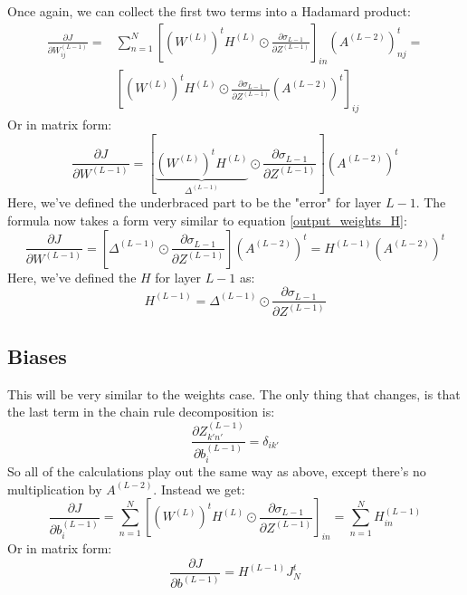 \documentclass[12pt, a4paper]{article}
\numberwithin{equation}{section}
\begin{document}
Once again, we can collect the first two terms into a Hadamard product:
\begin{align}
\frac{\partial J}{\partial W^{(L-1)}_{ij}}=&\sum_{n=1}^N\left[\left(W^{(L)}\right)^t H^{(L)}\odot\frac{\partial\sigma_{L-1}}{\partial Z^{(L-1)}}\right]_{in}\left(A^{(L-2)}\right)^t_{nj}=\\
&\left[\left(W^{(L)}\right)^t H^{(L)}\odot\frac{\partial\sigma_{L-1}}{\partial Z^{(L-1)}}\left(A^{(L-2)}\right)^t\right]_{ij}
\end{align}
Or in matrix form:
\begin{equation}
\label{last_hidden_weights_matrix}
\frac{\partial J}{\partial W^{(L-1)}}=\left[\underbrace{\left(W^{(L)}\right)^t H^{(L)}}_{\Delta^{(L-1)}}\odot\frac{\partial\sigma_{L-1}}{\partial Z^{(L-1)}}\right]\left(A^{(L-2)}\right)^t
\end{equation}
Here, we've defined the underbraced part to be the "error" for layer $L-1$. The formula now takes a form very similar to equation \ref{output_weights_H}:
\begin{equation}
\frac{\partial J}{\partial W^{(L-1)}}=\left[\Delta^{(L-1)}\odot\frac{\partial\sigma_{L-1}}{\partial Z^{(L-1)}}\right]\left(A^{(L-2)}\right)^t=H^{(L-1)}\left(A^{(L-2)}\right)^t
\end{equation}
Here, we've defined the $H$ for layer $L-1$ as:
\begin{equation}
H^{(L-1)}=\Delta^{(L-1)}\odot\frac{\partial\sigma_{L-1}}{\partial Z^{(L-1)}}
\end{equation}

\subsection{Biases}
This will be very similar to the weights case. The only thing that changes, is that the last term in the chain rule decomposition is:
\begin{equation}
\frac{\partial Z^{(L-1)}_{k'n'}}{\partial b^{(L-1)}_i}=\delta_{ik'}
\end{equation}
So all of the calculations play out the same way as above, except there's no multiplication by $A^{(L-2)}$. Instead we get:
\begin{equation}
\frac{\partial J}{\partial b^{(L-1)}_i}=\sum_{n=1}^N\left[\left(W^{(L)}\right)^t H^{(L)}\odot\frac{\partial\sigma_{L-1}}{\partial Z^{(L-1)}}\right]_{in}=\sum_{n=1}^N H^{(L-1)}_{in}
\end{equation}
Or in matrix form:
\begin{equation}
\frac{\partial J}{\partial b^{(L-1)}}=H^{(L-1)}J^t_N
\end{equation}
\end{document}
